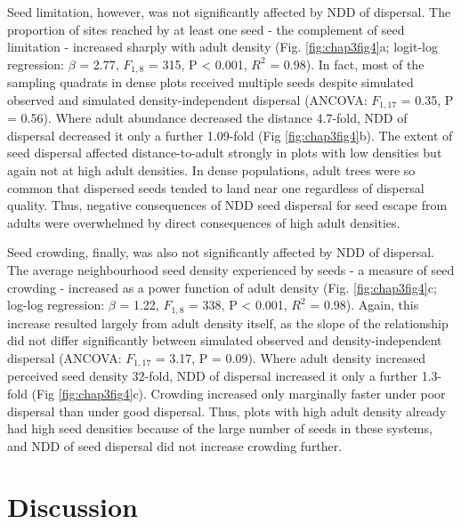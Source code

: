 \documentclass[b5paper,justified]{tufte-book} %
\begin{document}
\begin{fullwidth}
Seed limitation, however, was not significantly affected by NDD of dispersal. The proportion of sites reached by at least one seed - the complement of seed limitation - increased sharply with adult density (Fig. \ref{fig:chap3fig4}a; logit-log regression: $\beta$ = 2.77, $F_{1,8}$ = 315, P < 0.001, $R^2$ = 0.98). In fact, most of the sampling quadrats in dense plots received multiple seeds despite simulated observed and simulated density-independent dispersal (ANCOVA: $F_{1,17}$ = 0.35, P = 0.56). Where adult abundance decreased the distance 4.7-fold, NDD of dispersal decreased it only a further 1.09-fold (Fig \ref{fig:chap3fig4}b). The extent of seed dispersal affected distance-to-adult strongly in plots with low densities but again not at high adult densities. In dense populations, adult trees were so common that dispersed seeds tended to land near one regardless of dispersal quality. Thus, negative consequences of NDD seed dispersal for seed escape from adults were overwhelmed by direct consequences of high adult densities. 

Seed crowding, finally, was also not significantly affected by NDD of dispersal. The average neighbourhood seed density experienced by seeds - a measure of seed crowding - increased as a power function of adult density (Fig. \ref{fig:chap3fig4}c; log-log regression: $\beta$ = 1.22, $F_{1,8}$ = 338, P < 0.001, $R^2$ = 0.98). Again, this increase resulted largely from adult density itself, as the slope of the relationship did not differ significantly between simulated observed and density-independent dispersal (ANCOVA: $F_{1,17}$ = 3.17, P = 0.09). Where adult density increased perceived seed density 32-fold, NDD of dispersal increased it only a further 1.3-fold (Fig \ref{fig:chap3fig4}c). Crowding increased only marginally faster under poor dispersal than under good dispersal. Thus, plots with high adult density already had high seed densities because of the large number of seeds in these systems, and NDD of seed dispersal did not increase crowding further.

\section{Discussion}



\end{fullwidth}
\end{document}
